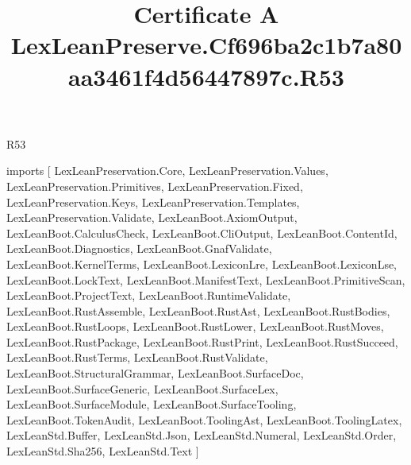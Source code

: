 \begin{lexlean}{R53}
\title{Certificate A LexLeanPreserve.Cf696ba2c1b7a80aa3461f4d56447897c.R53}
\begin{coremodule}
imports [
  LexLeanPreservation.Core,
  LexLeanPreservation.Values,
  LexLeanPreservation.Primitives,
  LexLeanPreservation.Fixed,
  LexLeanPreservation.Keys,
  LexLeanPreservation.Templates,
  LexLeanPreservation.Validate,
  LexLeanBoot.AxiomOutput,
  LexLeanBoot.CalculusCheck,
  LexLeanBoot.CliOutput,
  LexLeanBoot.ContentId,
  LexLeanBoot.Diagnostics,
  LexLeanBoot.GnafValidate,
  LexLeanBoot.KernelTerms,
  LexLeanBoot.LexiconLre,
  LexLeanBoot.LexiconLse,
  LexLeanBoot.LockText,
  LexLeanBoot.ManifestText,
  LexLeanBoot.PrimitiveScan,
  LexLeanBoot.ProjectText,
  LexLeanBoot.RuntimeValidate,
  LexLeanBoot.RustAssemble,
  LexLeanBoot.RustAst,
  LexLeanBoot.RustBodies,
  LexLeanBoot.RustLoops,
  LexLeanBoot.RustLower,
  LexLeanBoot.RustMoves,
  LexLeanBoot.RustPackage,
  LexLeanBoot.RustPrint,
  LexLeanBoot.RustSucceed,
  LexLeanBoot.RustTerms,
  LexLeanBoot.RustValidate,
  LexLeanBoot.StructuralGrammar,
  LexLeanBoot.SurfaceDoc,
  LexLeanBoot.SurfaceGeneric,
  LexLeanBoot.SurfaceLex,
  LexLeanBoot.SurfaceModule,
  LexLeanBoot.SurfaceTooling,
  LexLeanBoot.TokenAudit,
  LexLeanBoot.ToolingAst,
  LexLeanBoot.ToolingLatex,
  LexLeanStd.Buffer,
  LexLeanStd.Json,
  LexLeanStd.Numeral,
  LexLeanStd.Order,
  LexLeanStd.Sha256,
  LexLeanStd.Text
]


\end{coremodule}
\end{lexlean}
